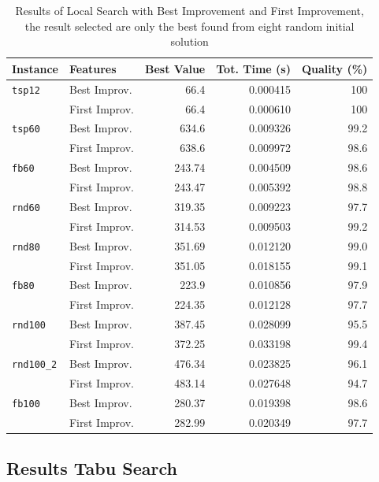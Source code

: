 	\begin{table}
		\centering
		\begin{tabular}{llrrr}
			\toprule
			\textbf{Instance} & \textbf{Features} & \textbf{Best Value} & \textbf{Tot. Time (s)} & \textbf{Quality (\%)} \\
			\midrule
			\verb|tsp12| & Best Improv. & 66.4 & 0.000415 & 100 \\
							& First Improv. & 66.4 & 0.000610 & 100 \\
			\midrule
			\verb|tsp60| 	& Best Improv. & 634.6 & 0.009326 & 99.2 \\
							& First Improv. & 638.6 & 0.009972 & 98.6 \\
			\midrule
			\verb|fb60|		& Best Improv. & 243.74 & 0.004509 & 98.6 \\
							& First Improv. & 243.47 & 0.005392 & 98.8 \\ 
			\midrule
			\verb|rnd60| 	& Best Improv. & 319.35 & 0.009223 & 97.7 \\
							& First Improv. & 314.53 & 0.009503 & 99.2 \\
			\midrule
			\verb|rnd80| 	& Best Improv. & 351.69 & 0.012120 & 99.0 \\
							& First Improv. & 351.05 & 0.018155 & 99.1 \\
			\midrule
			\verb|fb80| 	& Best Improv. & 223.9 & 0.010856 & 97.9 \\
							& First Improv. & 224.35 & 0.012128 & 97.7 \\
			\midrule
			\verb|rnd100| 	& Best Improv. & 387.45 & 0.028099 & 95.5 \\
							& First Improv. & 372.25 & 0.033198 & 99.4 \\
			\midrule
			\verb|rnd100_2| & Best Improv. & 476.34 & 0.023825 & 96.1 \\
							& First Improv. & 483.14 & 0.027648 & 94.7 \\
			\midrule
			\verb|fb100| & Best Improv. & 280.37 & 0.019398 & 98.6 \\
						& First Improv. & 282.99 & 0.020349 & 97.7 \\
			\bottomrule
		\end{tabular}
		\caption{\label{tab:LS-BestStrategyResult} Results of Local Search with Best Improvement and First Improvement, the result selected are only the best found from eight random initial solution}
	\end{table}
	
\newpage
\subsection{Results Tabu Search}
	
